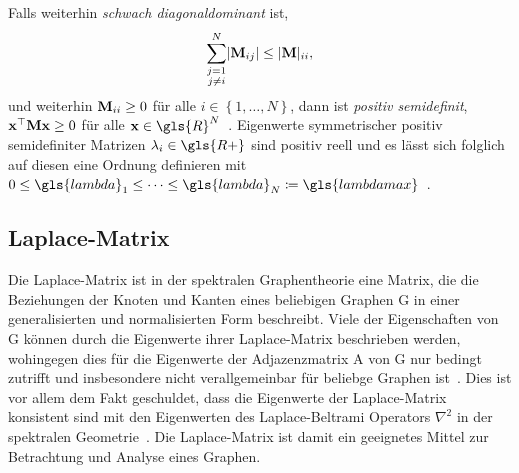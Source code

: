 Falls  weiterhin \emph{schwach diagonaldominant} ist, \dhe{}
\begin{equation}
  \sum_{\substack{j=1\\j \neq i}}^N \left|\ma{M}_{ij}\right| \leq \left|\ma{M}\right|_{ii},
  \label{eq:schwach_diagonaldominant}
\end{equation}
und weiterhin $\mathbf{M}_{ii} \geq 0$ für alle $i \in \left\{1, \ldots, N\right\}$, dann ist  \emph{positiv semidefinit}, \dhe{} $\mathbf{x}^{\top}\mathbf{M}\mathbf{x} \geq 0$ für alle $\ve{x} \in \gls{R}^{N}$~\cite{linear}.
Eigenwerte symmetrischer positiv semidefiniter Matrizen $\lambda_i \in \gls{R+}$ sind positiv reell und es lässt sich folglich auf diesen eine Ordnung definieren mit $0 \leq \gls{lambda}_1 \leq \cdots \leq \gls{lambda}_N \coloneqq \gls{lambdamax}$~\cite{linear}.

\subsection{Laplace-Matrix}
\label{laplace_matrix}

Die Laplace-Matrix ist in der spektralen Graphentheorie eine Matrix, die die Beziehungen der Knoten und Kanten eines beliebigen Graphen \gls{G} in einer generalisierten und normalisierten Form beschreibt.
Viele der Eigenschaften von \gls{G} können durch die Eigenwerte ihrer Laplace-Matrix beschrieben werden, wohingegen dies \bspw{} für die Eigenwerte der Adjazenzmatrix \gls{A} von \gls{G} nur bedingt zutrifft und insbesondere nicht verallgemeinbar für beliebge Graphen ist~\cite{Chung}.
Dies ist vor allem dem Fakt geschuldet, dass die Eigenwerte der Laplace-Matrix konsistent sind mit den Eigenwerten des Laplace-Beltrami Operators $\nabla^2$ in der spektralen Geometrie~\cite{Chung}.
Die Laplace-Matrix ist damit ein geeignetes Mittel zur Betrachtung und Analyse eines Graphen.


